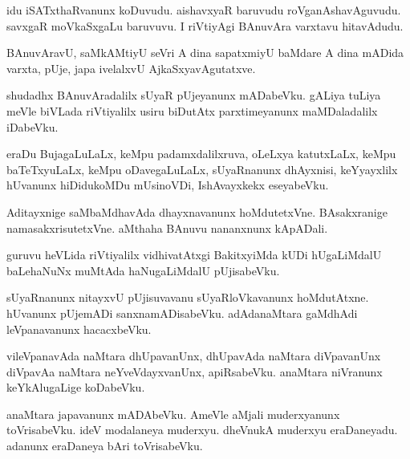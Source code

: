 \documentclass{article}
\begin{document}
\begin{mng}%
idu iSATxthaRvanunx koDuvudu. aishavxyaR baruvudu roVganAshavAguvudu. savxgaR moVkaSxgaLu 
baruvuvu. I riVtiyAgi BAnuvAra varxtavu hitavAdudu.
\end{mng}

\begin{mng}%
BAnuvAravU, saMkAMtiyU seVri A dina sapatxmiyU baMdare A dina mADida varxta, pUje, japa ivelalxvU 
AjkaSxyavAgutatxve.
\end{mng}

\begin{mng}%
shudadhx BAnuvAradalilx sUyaR pUjeyanunx mADabeVku. gALiya tuLiya meVle biVLada riVtiyalilx usiru 
biDutAtx parxtimeyanunx maMDaladalilx iDabeVku.
\end{mng}

\begin{mng}%
eraDu BujagaLuLaLx, keMpu padamxdalilxruva, oLeLxya katutxLaLx, keMpu baTeTxyuLaLx, keMpu 
oDavegaLuLaLx, sUyaRnanunx dhAyxnisi, keYyayxlilx hUvanunx hiDidukoMDu mUsinoVDi, IshAvayxkekx 
eseyabeVku.
\end{mng}

\begin{mng}%
Aditayxnige saMbaMdhavAda dhayxnavanunx hoMdutetxVne. BAsakxranige namasakxrisutetxVne. aMthaha 
BAnuvu nananxnunx kApADali.
\end{mng}

\begin{mng}%
guruvu heVLida riVtiyalilx vidhivatAtxgi BakitxyiMda kUDi hUgaLiMdalU baLehaNuNx muMtAda 
haNugaLiMdalU pUjisabeVku.
\end{mng}

\begin{mng}%
sUyaRnanunx nitayxvU pUjisuvavanu sUyaRloVkavanunx hoMdutAtxne. hUvanunx pUjemADi 
sanxnamADisabeVku. adAdanaMtara gaMdhAdi leVpanavanunx hacacxbeVku.
\end{mng}

\begin{mng}%
vileVpanavAda naMtara dhUpavanUnx, dhUpavAda naMtara diVpavanUnx diVpavAa naMtara 
neYveVdayxvanUnx, apiRsabeVku. anaMtara niVranunx keYkAlugaLige koDabeVku.
\end{mng}

\begin{mng}%
anaMtara japavanunx mADAbeVku. AmeVle aMjali muderxyanunx toVrisabeVku. ideV modalaneya muderxyu. 
dheVnukA muderxyu eraDaneyadu. adanunx eraDaneya bAri toVrisabeVku.
\end{mng}
\end{document}
